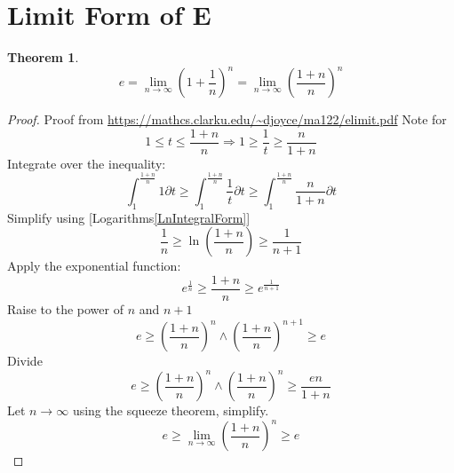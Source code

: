 \documentclass[]{article}
\newcommand{\pqty}[1]{{\left(#1\right)}}
\newtheorem{theorem}{Theorem}[section]
\numberwithin{equation}{section}
\begin{document}
	\section{Limit Form of E}
	\begin{theorem}
		\begin{equation}
		\label{limitE}
		e=\lim\limits_{n\to\infty}\pqty{1+\frac{1}{n}}^n
		=\lim\limits_{n\to\infty}\pqty{\frac{1+n}{n}}^n
		\end{equation}
	\end{theorem}
	\begin{proof}
		Proof from \url{https://mathcs.clarku.edu/~djoyce/ma122/elimit.pdf}
		Note for
		\begin{equation}
			1\leq t\leq \frac{1+n}{n}
			\Rightarrow
			1\geq \frac{1}{t}\geq \frac{n}{1+n}
		\end{equation}
		Integrate over the inequality:
		\begin{equation}
			\int_{1}^{\frac{1+n}{n}} 1\partial t
			\geq \int_{1}^{\frac{1+n}{n}} \frac{1}{t}\partial t
			\geq \int_{1}^{\frac{1+n}{n}} \frac{n}{1+n}\partial t
		\end{equation}
		Simplify using [Logarithms\eqref{LnIntegralForm}]
		\begin{equation}
			\frac{1}{n}
			\geq \ln\pqty{\frac{1+n}{n}}
			\geq \frac{1}{n+1}
		\end{equation}
		Apply the exponential function:
		\begin{equation}
			e^{\frac{1}{n}}
			\geq \frac{1+n}{n}
			\geq e^{\frac{1}{n+1}}
		\end{equation}
		Raise to the power of \(n\) and \(n+1\)
		\begin{equation}
			e
			\geq \pqty{\frac{1+n}{n}}^n
			\land
			\pqty{\frac{1+n}{n}}^{n+1}
			\geq e
		\end{equation}
		Divide
		\begin{equation}
			e
			\geq \pqty{\frac{1+n}{n}}^n
			\land
			\pqty{\frac{1+n}{n}}^n
			\geq \frac{en}{1+n}
		\end{equation}
		Let \(n\to\infty\) using the squeeze theorem, simplify.
		\begin{equation}
			e
			\geq \lim\limits_{n\to\infty}\pqty{\frac{1+n}{n}}^n
			\geq e
		\end{equation}
		
	\end{proof}
	
\end{document}
